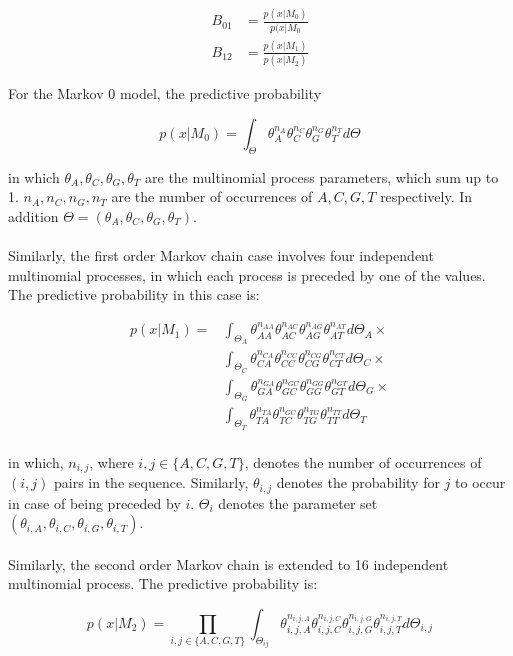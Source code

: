 \documentclass[paper=a4, fontsize=11pt]{scrartcl} %
\numberwithin{equation}{section} %
\numberwithin{figure}{section} %
\numberwithin{table}{section} %
\begin{document}
\begin {align*}
  B_{01} &= \frac {p (x| M_0)} {p(x | M_0} \\
  B_{12} &= \frac {p (x| M_1)} {p(x | M_2)}
\end {align*}

For the Markov 0 model, the predictive probability 

\begin {equation}
p (x| M_0) = \int_{\Theta} \theta_{A}^{n_{A}} \theta_{C}^{n_{C}} \theta_{G}^{n_{G}} \theta_{T}^{n_{T}} d\Theta
\end {equation}

in which $\theta_A, \theta_C, \theta_G, \theta_T$ are the multinomial process parameters, which sum up to 1. $n_A, n_C, n_G, n_T$ are the number of occurrences of ${A, C, G, T}$ respectively. In addition $\Theta = (\theta_A, \theta_C, \theta_G, \theta_T)$.
\\\\
Similarly, the first order Markov chain case involves four independent multinomial processes, in which each process is preceded by one of the values. The predictive probability in this case is:

\begin {align*}
p (x| M_1) = &\int_{\Theta_A} \theta_{AA}^{n_{AA}} \theta_{AC}^{n_{AC}} \theta_{AG}^{n_{AG}} \theta_{AT}^{n_{AT}} d\Theta_A \times\\
& \int_{\Theta_C} \theta_{CA}^{n_{CA}} \theta_{CC}^{n_{CC}} \theta_{CG}^{n_{CG}} \theta_{CT}^{n_{CT}} d\Theta_C \times \\
& \int_{\Theta_G} \theta_{GA}^{n_{GA}} \theta_{GC}^{n_{GC}} \theta_{GG}^{n_{GG}} \theta_{GT}^{n_{GT}} d\Theta_G \times \\
& \int_{\Theta_T} \theta_{TA}^{n_{TA}} \theta_{TC}^{n_{GC}} \theta_{TG}^{n_{TG}} \theta_{TT}^{n_{TT}} d\Theta_T \\
\end {align*}

in which, $n_{i,j}$, where $i,j \in \{A,C,G,T\}$, denotes the number of occurrences of $(i,j)$ pairs in the sequence. Similarly, $\theta_{i,j}$ denotes the probability for $j$ to occur in case of being preceded by $i$. $\Theta_i$ denotes the parameter set $(\theta_{i,A}, \theta_{i,C}, \theta_{i,G}, \theta_{i,T})$.
\\\\
Similarly, the second order Markov chain is extended to 16 independent multinomial process. The predictive probability is:

\begin {equation}
  p (x| M_2) = \prod_{i,j \in \{A,C,G,T\}} \int_{\Theta_{ij}} \theta_{i,j,A}^{n_{i,j,A}} \theta_{i,j,C}^{n_{i,j,C}} \theta_{i,j,G}^{n_{i,j,G}} \theta_{i,j,T}^{n_{i,j,T}} d\Theta_{i,j} 
\end {equation}  
\end{document}
